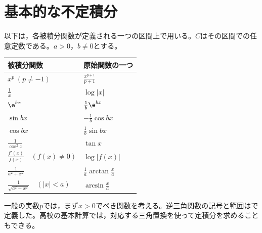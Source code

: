 \section{基本的な不定積分}
以下は，各被積分関数が定義される一つの区間上で用いる。$C$はその区間での任意定数である。$a>0$，$b\ne0$とする。
\begin{longtable}{@{}ll@{}}
\toprule
被積分関数 & 原始関数の一つ\\
\midrule
\endhead
$x^p\ (p\ne-1)$ & $\frac{x^{p+1}}{p+1}$\\[4pt]
$\frac1x$ & $\log|x|$\\[4pt]
$\e^{bx}$ & $\frac1b\e^{bx}$\\[4pt]
$\sin bx$ & $-\frac1b\cos bx$\\[4pt]
$\cos bx$ & $\frac1b\sin bx$\\[4pt]
$\frac1{\cos^2x}$ & $\tan x$\\[4pt]
$\frac{f'(x)}{f(x)}\quad(f(x)\ne0)$ & $\log|f(x)|$\\[4pt]
$\frac1{a^2+x^2}$ & $\frac1a\arctan\frac xa$\\[4pt]
$\frac1{\sqrt{a^2-x^2}}\quad(|x|<a)$ & $\arcsin\frac xa$\\[4pt]
\bottomrule
\end{longtable}
一般の実数$p$では，まず$x>0$でべき関数を考える。逆三角関数の記号と範囲はで定義した。高校の基本計算では，対応する三角置換を使って定積分を求めることもできる。

